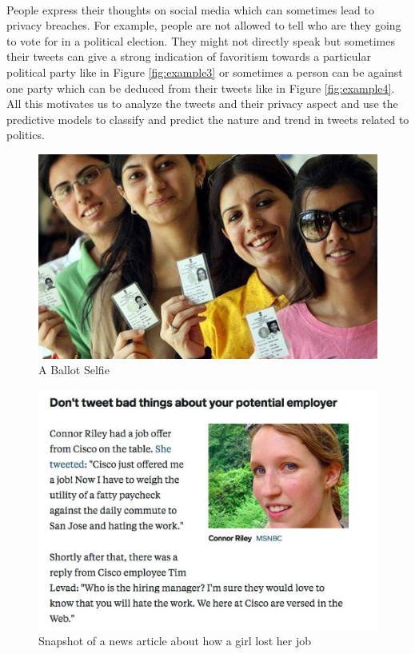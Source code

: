 \documentclass[a4paper,11pt]{article}
\begin{document}
\medskip\\
People express their thoughts on social media which can sometimes lead to privacy breaches. For example, people are not allowed to tell who are they going to vote for in a political election. They might not directly speak but sometimes their tweets can give a strong indication of favoritism towards a particular political party like in Figure \ref{fig:example3} or sometimes a person can be against one party which can be deduced from their tweets like in Figure \ref{fig:example4}.
\medskip\\
All this motivates us to analyze the tweets and their privacy aspect and use the predictive models to classify and predict the nature and trend in tweets related to politics.

\begin{figure}
    \centering
  \includegraphics[width=13.5cm]{ballot.jpg}
  \caption{A Ballot Selfie}
  \label{fig:example1}
\end{figure}

\begin{figure}
  \includegraphics[width=\linewidth]{CiscoTweet.png}
  \caption{Snapshot of a news article about how a girl lost her job}
  \label{fig:example2}
\end{figure}
\end{document}
